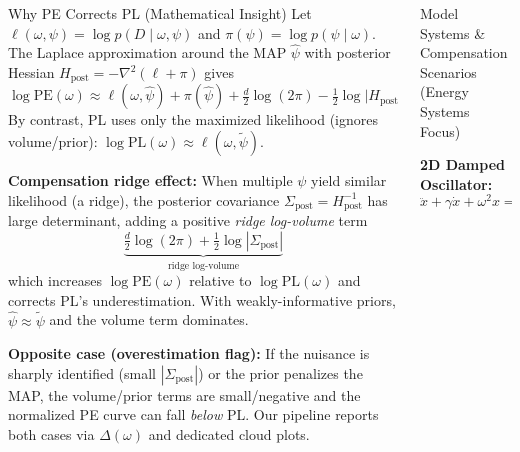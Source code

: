 \documentclass[final,hyperref={pdfpagelabels=false}]{beamer}
\begin{document}
\begin{frame}[t]
\begin{columns}[t,totalwidth=\textwidth]
\begin{column}{0.32\textwidth}
\begin{block}{Why PE Corrects PL (Mathematical Insight)}
\small
Let $\ell(\omega,\psi)=\log p(D\mid \omega,\psi)$ and $\pi(\psi)=\log p(\psi\mid\omega)$. The Laplace approximation around the MAP $\hat{\psi}$ with posterior Hessian $H_{\text{post}}=-\nabla^2\!(\ell+\pi)$ gives
\begin{equation}
\log \mathrm{PE}(\omega) \approx \ell(\omega,\hat{\psi}) + \pi(\hat{\psi}) + \tfrac{d}{2}\log(2\pi) - \tfrac{1}{2}\log\big|H_{\text{post}}(\omega,\hat{\psi})\big|.
\end{equation}
By contrast, PL uses only the maximized likelihood (ignores volume/prior): $\log\mathrm{PL}(\omega) \approx \ell(\omega,\tilde{\psi})$.

\textbf{Compensation ridge effect:} When multiple $\psi$ yield similar likelihood (a ridge), the posterior covariance $\Sigma_{\text{post}}=H_{\text{post}}^{-1}$ has large determinant, adding a positive \emph{ridge log-volume} term
\begin{equation}
\underbrace{\tfrac{d}{2}\log(2\pi) + \tfrac{1}{2}\log|\Sigma_{\text{post}}|}_{\text{ridge log-volume}}
\end{equation}
which increases $\log\mathrm{PE}(\omega)$ relative to $\log\mathrm{PL}(\omega)$ and corrects PL's underestimation. With weakly-informative priors, $\hat{\psi}\!\approx\!\tilde{\psi}$ and the volume term dominates.

\textbf{Opposite case (overestimation flag):} If the nuisance is sharply identified (small $|\Sigma_{\text{post}}|$) or the prior penalizes the MAP, the volume/prior terms are small/negative and the normalized PE curve can fall \emph{below} PL. Our pipeline reports both cases via $\Delta(\omega)$ and dedicated cloud plots.
\end{block}

\end{column}

\begin{column}{0.36\textwidth}

\begin{block}{Model Systems \& Compensation Scenarios (Energy Systems Focus)}
\small

\textbf{2D Damped Oscillator:}
\begin{equation}
\ddot{x} + \gamma \dot{x} + \omega^2 x = \zeta \omega \sin(\omega t) + \epsilon_t
\end{equation}


\end{block}
\end{column}
\end{columns}
\end{frame}
\end{document}
